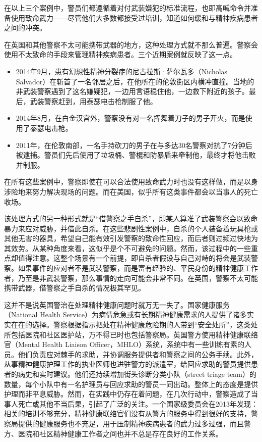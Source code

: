 \documentclass[fontset=fandol, a4paper, 12pt, openright]{ctexbook}
\begin{document}
在以上三个案例中，警员们都遵循着对付武装嫌犯的标准流程，也即高喊命令并准备使用致命武力——尽管他们大多数都接受过培训，知道如何缓和与精神疾病患者之间的冲突。

在英国和其他警察不太可能携带武器的地方，这种处理方式就不那么普遍。警察会使用不太致命的手段来管理精神疾病患者。三个近期案例就反映了这一点。

\begin{itemize}
    \item 2014年9月，患有幻想性精神分裂症的尼古拉斯·萨尔瓦多（Nicholas Salvador）在斩首了一名邻居之后，在他所在的伦敦街区内横冲直撞。当地的非武装警察遇到了这名嫌疑犯，一边用言语稳住他，一边救下附近的孩子。最后，武装警察赶到，用泰瑟电击枪制服了他。
    \item 2014年8月，在白金汉宫外，警察没有对一名挥舞着刀子的男子开火，而是使用了泰瑟电击枪。
    \item 2011年，在伦敦南部，一名手持砍刀的男子在与多达30名警察对抗了7分钟后被逮捕。警员们先后使用了垃圾桶、警棍和防暴盾来牵制他，最终才将他击败并制服。
\end{itemize}

在所有这些案例中，警察即使在可以合法使用致命武力时也没有这样做，而是以身涉险地来努力解决现场的问题。而在美国，似乎所有这类事件都会以当事人的死亡收场。

该处理方式的另一种形式就是“借警察之手自杀”，即某人算准了武装警察会以致命暴力来应对威胁，并借此自杀。在这些悲剧性案例中，自杀的个人装备着玩具枪或其他无害的器具，希望自己能有效引发警察的致命性回应，而后者则过频过快地为其效劳。从某种角度来看，这似乎是个不可避免的问题。然而，该过程中的一些重点却值得注意。这整个场景有一个前提，即自杀者假设与自己对峙的将会是武装警察。如果事件的应对者不是武装警察，而是富有经验的、平民身份的精神健康工作者，乃至是非武装警察，那么事情的走向可能会非常不同。在英国，警察不太可能携带武器，借警察之手自杀的情况极其罕见。

这并不是说英国警治在处理精神健康问题时就万无一失了。国家健康服务（National Health Service）为病情危急或有长期精神健康需求的人提供了诸多实实在在的选择。警察根据指示把处在精神健康危险期的人带到“安全处所”，这类处所包括医院和社区医护站，万不得已时也包括警察局。英国警方使用精神健康联络官（Mental Health Liaison Officer，MHLO）系统，系统中有一些训练有素的人员。他们负责应对棘手的求助，并协调服务提供者和警察之间的公务手续。此外，从事精神健康护理工作的执业医师也进驻警方的派遣室，给回应求助的警员提供患者的病史和实时建议。他们还持续增加街头诊断分类小队（street triage team）的数量，每个小队中有一名护理员与回应求助的警员一同出动。整体上的态度是提供护理而非平息威胁。然而，在实践中仍存在着问题，在几次行动中，警察造成了当事人死亡或其他不当后果，引起了广泛的关注。一个国家级委员会在2013年发现：相关的培训不够充分，精神健康联络官们没有从警方的服务中得到很好的支持，警察局提供的健康服务也不充足，用于压制精神疾病患者的武力过多过强，而且警方、医院和社区精神健康工作者之间也并不总是存在良好的工作关系。
\end{document}

